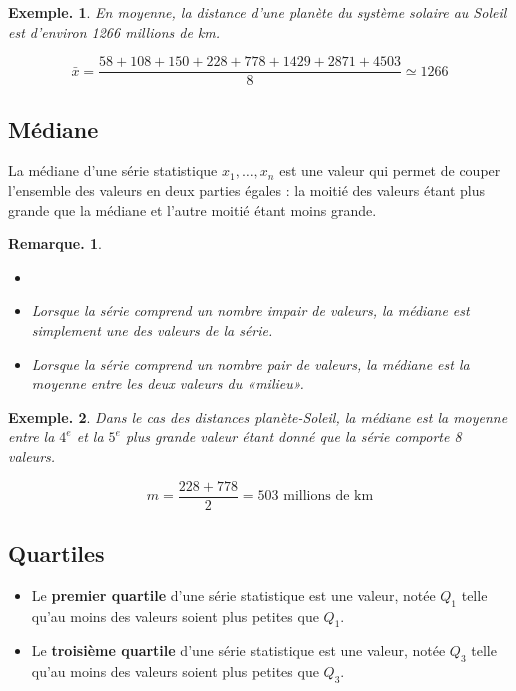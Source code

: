 \documentclass[12pt]{article}
\theoremstyle{break}
\newtheorem*{example}{Exemple.}
\newtheorem*{remark}{Remarque.}
\begin{document}
\begin{example}
  En moyenne, la distance d'une planète du système solaire au Soleil est d'environ 1266 millions de km.

  $$
  \bar{x}=\frac{58+108+150+228+778+1429+2871+4503}{8} \simeq 1266
  $$
\end{example}

\subsection{Médiane}
\begin{definition}{}{}
  La médiane d'une série statistique $x_{1}, \ldots, x_{n}$ est une valeur qui permet de couper l'ensemble des valeurs en deux parties égales : la moitié des valeurs étant plus grande que la médiane et l'autre moitié étant moins grande.
\end{definition}

\begin{remark}
  \begin{itemize}
    \item[]
    \item Lorsque la série comprend un nombre impair de valeurs, la médiane est simplement une des valeurs de la série.
    \item Lorsque la série comprend un nombre pair de valeurs, la médiane est la moyenne entre les deux valeurs du «milieu».
  \end{itemize}
\end{remark}

\begin{example}
  Dans le cas des distances planète-Soleil, la médiane est la moyenne entre la $4^{e}$ et la $5^{e}$ plus grande valeur étant donné que la série comporte 8 valeurs.

  $$
  m=\frac{228+778}{2}=503 \text { millions de } \mathrm{km}
  $$
\end{example}

\subsection{Quartiles}
\begin{definition}{}{}
  \begin{itemize}
    \item Le \textbf{premier quartile} d'une série statistique est une valeur, notée $Q_{1}$ telle qu'au moins  des valeurs soient plus petites que $Q_{1}$.
    \item Le  \textbf{troisième quartile} d'une série statistique est une valeur, notée $Q_{3}$ telle qu'au moins  des valeurs soient plus petites que $Q_{3}$.
  \end{itemize}
\end{definition}
\end{document}

